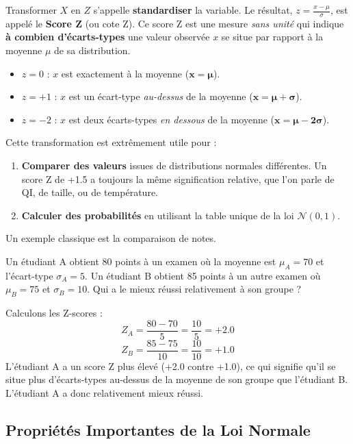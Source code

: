 \begin{intuitionbox}
Transformer $X$ en $Z$ s'appelle \textbf{standardiser} la variable. Le résultat, $z = \frac{x-\mu}{\sigma}$, est appelé le \textbf{Score Z} (ou cote Z). Ce score Z est une mesure \textit{sans unité} qui indique \textbf{à combien d'écarts-types} une valeur observée $x$ se situe par rapport à la moyenne $\mu$ de sa distribution.
\begin{itemize}
    \item $z = 0$ : $x$ est exactement à la moyenne ($\mathbf{x = \mu}$).
    \item $z = +1$ : $x$ est un écart-type \textit{au-dessus} de la moyenne ($\mathbf{x = \mu + \sigma}$).
    \item $z = -2$ : $x$ est deux écarts-types \textit{en dessous} de la moyenne ($\mathbf{x = \mu - 2\sigma}$).
\end{itemize}
Cette transformation est extrêmement utile pour :
\begin{enumerate}
    \item \textbf{Comparer des valeurs} issues de distributions normales différentes. Un score Z de +1.5 a toujours la même signification relative, que l'on parle de QI, de taille, ou de température.
    \item \textbf{Calculer des probabilités} en utilisant la table unique de la loi $\mathcal{N}(0, 1)$.
\end{enumerate}
\end{intuitionbox}

Un exemple classique est la comparaison de notes.

\begin{examplebox}
Un étudiant A obtient 80 points à un examen où la moyenne est $\mu_A=70$ et l'écart-type $\sigma_A=5$. Un étudiant B obtient 85 points à un autre examen où $\mu_B=75$ et $\sigma_B=10$. Qui a le mieux réussi relativement à son groupe ?

Calculons les Z-scores :
$$ Z_A = \frac{80 - 70}{5} = \frac{10}{5} = +2.0 $$
$$ Z_B = \frac{85 - 75}{10} = \frac{10}{10} = +1.0 $$
L'étudiant A a un score Z plus élevé (+2.0 contre +1.0), ce qui signifie qu'il se situe plus d'écarts-types au-dessus de la moyenne de son groupe que l'étudiant B. L'étudiant A a donc relativement mieux réussi.
\end{examplebox}

\subsection{Propriétés Importantes de la Loi Normale}

